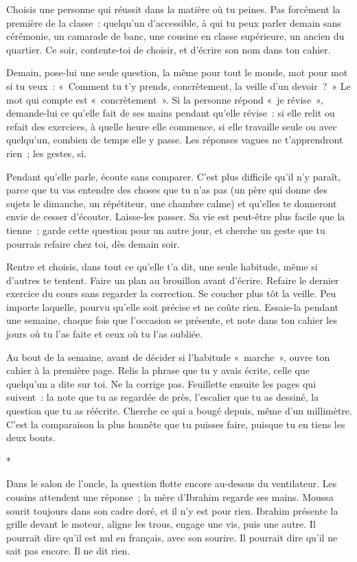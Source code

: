 \documentclass[10.5pt,twoside,openright]{book}
\newcommand{\asterisme}{\par\vspace{0.7em}\centerline{\color{gris}*\quad*\quad*}\vspace{0.7em}\par\noindent}
\newcommand{\soustitre}[1]{\par\vspace{1.1em}\noindent{\bfseries\color{accent}#1}\par\vspace{0.4em}\noindent}
\begin{document}
\soustitre{Ce soir, essaie ceci}

Choisis une personne qui réussit dans la matière où tu peines. Pas forcément la première de la classe : quelqu’un d’accessible, à qui tu peux parler demain sans cérémonie, un camarade de banc, une cousine en classe supérieure, un ancien du quartier. Ce soir, contente-toi de choisir, et d’écrire son nom dans ton cahier.

Demain, pose-lui une seule question, la même pour tout le monde, mot pour mot si tu veux : « Comment tu t’y prends, concrètement, la veille d’un devoir ? » Le mot qui compte est « concrètement ». Si la personne répond « je révise », demande-lui ce qu’elle fait de ses mains pendant qu’elle révise : si elle relit ou refait des exercices, à quelle heure elle commence, si elle travaille seule ou avec quelqu’un, combien de temps elle y passe. Les réponses vagues ne t’apprendront rien ; les gestes, si.

Pendant qu’elle parle, écoute sans comparer. C’est plus difficile qu’il n’y paraît, parce que tu vas entendre des choses que tu n’as pas (un père qui donne des sujets le dimanche, un répétiteur, une chambre calme) et qu’elles te donneront envie de cesser d’écouter. Laisse-les passer. Sa vie est peut-être plus facile que la tienne ; garde cette question pour un autre jour, et cherche un geste que tu pourrais refaire chez toi, dès demain soir.

Rentre et choisis, dans tout ce qu’elle t’a dit, une seule habitude, même si d’autres te tentent. Faire un plan au brouillon avant d’écrire. Refaire le dernier exercice du cours sans regarder la correction. Se coucher plus tôt la veille. Peu importe laquelle, pourvu qu’elle soit précise et ne coûte rien. Essaie-la pendant une semaine, chaque fois que l’occasion se présente, et note dans ton cahier les jours où tu l’as faite et ceux où tu l’as oubliée.

Au bout de la semaine, avant de décider si l’habitude « marche », ouvre ton cahier à la première page. Relis la phrase que tu y avais écrite, celle que quelqu’un a dite sur toi. Ne la corrige pas. Feuillette ensuite les pages qui suivent : la note que tu as regardée de près, l’escalier que tu as dessiné, la question que tu as réécrite. Cherche ce qui a bougé depuis, même d’un millimètre. C’est la comparaison la plus honnête que tu puisses faire, puisque tu en tiens les deux bouts.

\asterisme

Dans le salon de l’oncle, la question flotte encore au-dessus du ventilateur. Les cousins attendent une réponse ; la mère d’Ibrahim regarde ses mains. Moussa sourit toujours dans son cadre doré, et il n’y est pour rien. Ibrahim présente la grille devant le moteur, aligne les trous, engage une vis, puis une autre. Il pourrait dire qu’il est nul en français, avec son sourire. Il pourrait dire qu’il ne sait pas encore. Il ne dit rien.
\end{document}
